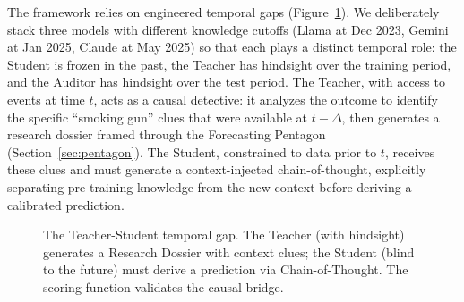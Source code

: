 \documentclass[11pt,a4paper]{article}
\begin{document}
The framework relies on engineered temporal gaps (Figure~\ref{fig:temporal-gap}). We deliberately stack three models with different knowledge cutoffs (Llama at Dec 2023, Gemini at Jan 2025, Claude at May 2025) so that each plays a distinct temporal role: the Student is frozen in the past, the Teacher has hindsight over the training period, and the Auditor has hindsight over the test period. The Teacher, with access to events at time $t$, acts as a causal detective: it analyzes the outcome to identify the specific ``smoking gun'' clues that were available at $t-\Delta$, then generates a research dossier framed through the Forecasting Pentagon (Section~\ref{sec:pentagon}). The Student, constrained to data prior to $t$, receives these clues and must generate a context-injected chain-of-thought, explicitly separating pre-training knowledge from the new context before deriving a calibrated prediction.

\begin{figure}[htbp]
\centering
{}
\caption{The Teacher-Student temporal gap. The Teacher (with hindsight) generates a Research Dossier with context clues; the Student (blind to the future) must derive a prediction via Chain-of-Thought. The scoring function validates the causal bridge.}
\label{fig:temporal-gap}
\end{figure}
\end{document}
